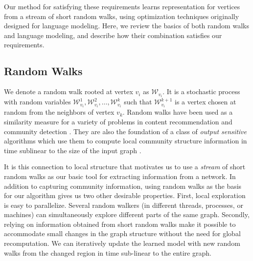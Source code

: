 \documentclass{sig-alternate}
\begin{document}
Our method for satisfying these requirements learns representation for vertices from a stream of short random walks, using optimization techniques originally designed for language modeling.
Here, we review the basics of both random walks and language modeling, and describe how their combination satisfies our requirements.

\subsection{Random Walks}
We denote a random walk rooted at vertex $v_i$ as $\mathcal{W}_{v_i}$.  
It is a stochastic process with random variables $\mathcal{W}^1_{v_i},\mathcal{W}^2_{v_i},\dots{},\mathcal{W}^k_{v_i}$ such that $\mathcal{W}^{k+1}_{v_i}$ is a vertex chosen at random from the neighbors of vertex $v_k$.
Random walks have been used as a similarity measure for a variety of problems in content recommendation \cite{fouss2007random} and community detection \cite{andersen2006local}.
They are also the foundation of a class of \emph{output sensitive} algorithms which use them to compute local community structure information in time sublinear to the size of the input graph \cite{spielman2004nearly}.

It is this connection to local structure that motivates us to use a \emph{stream} of short random walks as our basic tool for extracting information from a network.
In addition to capturing community information, using random walks as the basis for our algorithm gives us two other desirable properties.  First, 
local exploration is easy to parallelize.  Several random walkers (in different threads, processes, or machines) can simultaneously explore different parts of the same graph.
Secondly, relying on information obtained from short random walks make it possible to accommodate small changes in the graph structure without the need for global recomputation.
We can iteratively update the learned model with new random walks from the changed region in time sub-linear to the entire graph.
\end{document}
